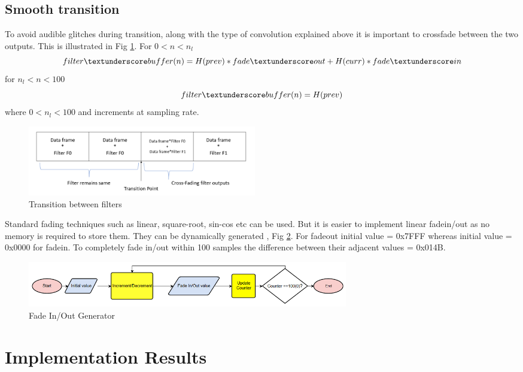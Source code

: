 \documentclass[conference]{IEEEtran}
\begin{document}
\subsection{Smooth transition}
 To avoid audible glitches during transition, along with the type of convolution explained above it is important to crossfade between the two outputs. This is illustrated in Fig \ref{fig:crossfade}. 
 For $0<n<n_l$
 \begin{equation}
     filter \textunderscore buffer(n) = H(prev)*fade \textunderscore out + H(curr)*fade \textunderscore in
 \end{equation}
 for $n_l<n<100$ 
 \begin{equation}
     filter \textunderscore buffer(n) =  H(prev)
 \end{equation}
 where $0<n_l<100$ and increments at sampling rate. 
 \begin{figure}
     \centering
     \includegraphics[width = 10cm]{Crossfade.png}
     \caption{Transition between filters}
     \label{fig:crossfade}
 \end{figure}
 
 Standard fading techniques such as linear, square-root, sin-cos etc can be used. But it is easier to implement linear fadein/out as no memory is required to store them. They can be dynamically generated , Fig \ref{fig:fadegen}. For fade\textunderscore out initial value = 0x7FFF whereas initial value = 0x0000 for fade\textunderscore in. To completely fade in/out within 100 samples the difference between their adjacent values = 0x014B. 
 \begin{figure}
     \centering
     \includegraphics[width = \linewidth, height = 2cm]{fade_gen.png}
     \caption{Fade In/Out Generator}
     \label{fig:fadegen}
 \end{figure}
 
\section{Implementation Results}
\end{document}
